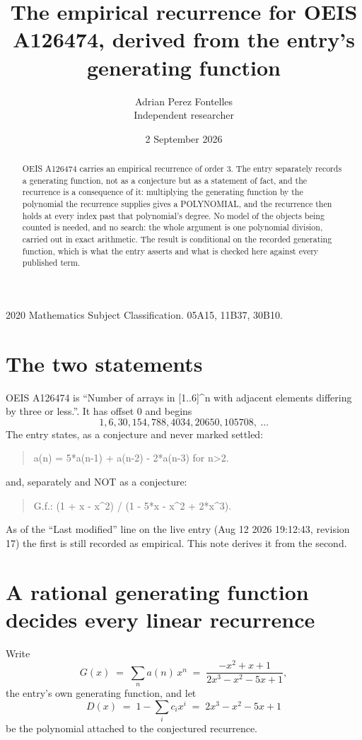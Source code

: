 \documentclass[11pt,a4paper]{article}
\title{The empirical recurrence for OEIS A126474, derived from the entry's generating function}
\author{Adrian Perez Fontelles\\ \small Independent researcher}
\date{2 September 2026}
\theoremstyle{plain}
\theoremstyle{definition}
\begin{document}
\maketitle

\begin{abstract}
OEIS A126474 carries an empirical recurrence of order $3$. The entry separately records a
generating function, not as a conjecture but as a statement of fact, and the recurrence is a
consequence of it: multiplying the generating function by the polynomial the recurrence
supplies gives a POLYNOMIAL, and the recurrence then holds at every index past that
polynomial's degree. No model of the objects being counted is needed, and no search: the
whole argument is one polynomial division, carried out in exact arithmetic. The result is
conditional on the recorded generating function, which is what the entry asserts and what is
checked here against every published term.
\end{abstract}

\noindent\small 2020 Mathematics Subject Classification. 05A15, 11B37, 30B10.\normalsize

\section{The two statements}

OEIS A126474 is ``Number of arrays in [1..6]\^{}n with adjacent elements differing by three or less.''. It has offset $0$ and begins
\[
1, 6, 30, 154, 788, 4034, 20650, 105708,\ \dots
\]
The entry states, as a conjecture and never marked settled:
\begin{quote}
a(n) = 5*a(n-1) + a(n-2) - 2*a(n-3) for n>2.
\end{quote}
and, separately and NOT as a conjecture:
\begin{quote}
G.f.: (1 + x - x\^{}2) / (1 - 5*x - x\^{}2 + 2*x\^{}3).
\end{quote}
As of the ``Last modified'' line on the live entry (Aug 12 2026 19:12:43, revision 17) the first is still
recorded as empirical. This note derives it from the second.

\section{A rational generating function decides every linear recurrence}

Write
\[
G(x)\;=\;\sum_{n}a(n)\,x^{n}\;=\;\frac{- x^{2} + x + 1}{2 x^{3} - x^{2} - 5 x + 1},
\]
the entry's own generating function, and let
\[
D(x)\;=\;1-\sum_i c_i x^{i}\;=\;2 x^{3} - x^{2} - 5 x + 1
\]
be the polynomial attached to the conjectured recurrence.
\end{document}
